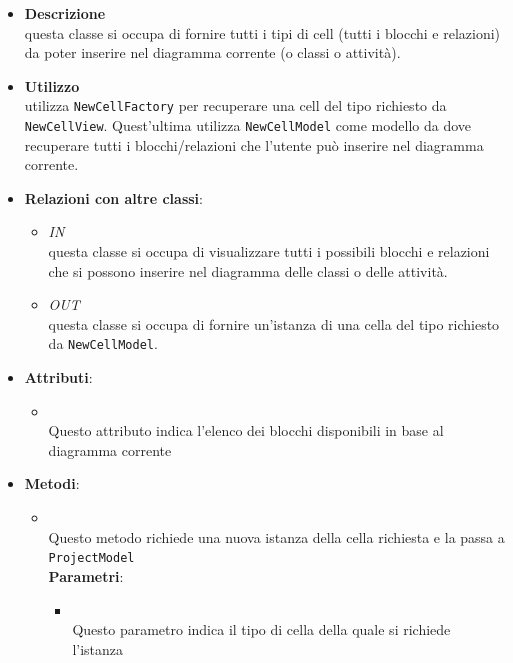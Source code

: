 \label{\nogloxy{swedesigner::client::model::NewCellModel}}
\begin{itemize}
\item \textbf{Descrizione}\\
questa classe si occupa di fornire tutti i tipi di cell (tutti i blocchi e relazioni) da poter inserire nel diagramma corrente (o classi o attività).
\item \textbf{Utilizzo}\\
utilizza \texttt{NewCellFactory} per recuperare una cell del tipo richiesto da \texttt{NewCellView}. Quest'ultima utilizza \texttt{NewCellModel} come modello da dove recuperare tutti i blocchi/relazioni che l'utente può inserire nel diagramma corrente.
\item \textbf{Relazioni con altre classi}:
\begin{itemize}
\item \textit{IN} \hyperref[\nogloxy{swedesigner::client::view::NewCellView}]{}\\
questa classe si occupa di visualizzare tutti i possibili blocchi e relazioni che si possono inserire nel diagramma delle classi o delle attività.
\item \textit{OUT} \hyperref[\nogloxy{swedesigner::client::model::NewCellFactory}]{}\\
questa classe si occupa di fornire un'istanza di una cella del tipo richiesto da \texttt{NewCellModel}. 
\end{itemize}
\item \textbf{Attributi}:
\begin{itemize}
\item {}
\\ Questo attributo indica l'elenco dei blocchi disponibili in base al diagramma corrente
\end{itemize}
\item \textbf{Metodi}:
\begin{itemize}
\item {}
\\ Questo metodo richiede una nuova istanza della cella richiesta e la passa a \texttt{ProjectModel}
\\ \textbf{Parametri}:
\begin{itemize}
\item {}
\\ Questo parametro indica il tipo di cella della quale si richiede l'istanza

\end{itemize}
\end{itemize}
\end{itemize}
